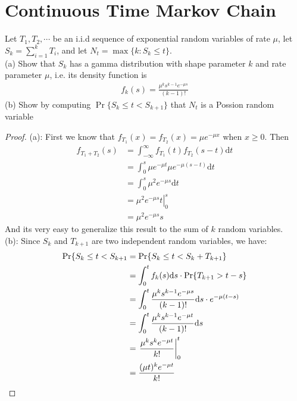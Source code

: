 \section{Continuous Time Markov Chain}

\begin{exercise}
  Let $T_1, T_2, \cdots$ be an i.i.d sequence of exponential random variables of rate $\mu$,
  let $S_k = \sum_{i=1}^k T_i$, and let $N_t = \max\{k: S_k\leq t\}$. \\
  (a) Show that $S_k$ has a gamma distribution with shape parameter $k$ and rate parameter $\mu$,
  i.e. its density function is
  \begin{align*}
    f_k(s) = \frac{\mu^ks^{k-1}e^{-\mu s}}{(k-1)!}
  \end{align*}
  (b) Show by computing $\Pr\{S_k\leq t < S_{k+1}\}$ that $N_t$ is a Possion random variable
\end{exercise}
\begin{proof}
  (a): First we know that $f_{T_1}(x) = f_{T_2}(x) = \mu e^{-\mu x}$ when $x \geq 0$.
  Then
  \begin{align*}
  f_{T_1 + T_2}(s) &= \int_{-\infty}^{\infty} f_{T_1}(t) f_{T_2}(s - t) \mathrm{d}t \\
                   &= \int_{0}^{s} \mu e^{-\mu t} \mu e^{-\mu (s - t)} \mathrm{d}t\\
                   &= \int_{0}^{s} \mu^2 e^{-\mu s}\mathrm{d}t\\
                   &= \left.\mu^2e^{-\mu s} t \right|^s_0  \\
                   &= \mu^2e^{-\mu s} s
  \end{align*}
  And its very easy to generalize this result to the sum of $k$ random variables. \\
  (b): Since $S_k$ and $T_{k+1}$ are two independent random variables, we have:
  \begin{align*}
    \Pr\{S_k \leq t < S_{k+1} &= \Pr\{S_k \leq t < S_k + T_{k+1}\} \\
                              &= \int_0^t f_k(s)\mathrm{d}s \cdot \Pr\{T_{k+1} > t - s\} \\
                              &= \int_0^t \frac{\mu^k s^{k-1} e^{-\mu s}}{(k-1)!}\mathrm{d}s \cdot e^{-\mu (t - s)} \\
                              &= \int_0^t \frac{\mu^ks^{k-1}e^{-\mu t}}{(k-1)!}\mathrm{d}s \\
                              &= \left.\frac{\mu^ks^ke^{-\mu t}}{k!} \right|^t_0 \\
                              &= \frac{(\mu t)^ke^{-\mu t}}{k!} \qedhere
  \end{align*}
\end{proof}

